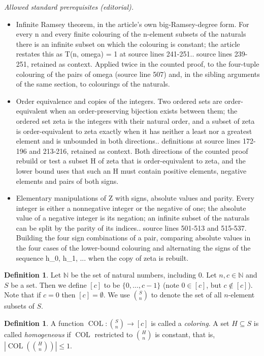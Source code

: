 \documentclass[10pt,a4paper]{article}
\newcommand{\COL}{\operatorname{COL}}
\newcommand{\N}{\mathbb{N}}
\newcommand{\numpoints}{n}
\newcommand{\numcolors}{c}
\theoremstyle{plain}
\theoremstyle{definition}
\newtheorem{definition}[theorem]{Definition}
\begin{document}
\noindent\textit{Allowed standard prerequisites (editorial).}\begin{itemize}
\item Infinite Ramsey theorem, in the article's own big-Ramsey-degree form. For every n and every finite colouring of the n-element subsets of the naturals there is an infinite subset on which the colouring is constant; the article restates this as T(n, omega) = 1 at source lines 241-251.. source lines 239-251, retained as context. Applied twice in the counted proof, to the four-tuple colouring of the pairs of omega (source line 507) and, in the sibling arguments of the same section, to colourings of the naturals.
\item Order equivalence and copies of the integers. Two ordered sets are order-equivalent when an order-preserving bijection exists between them; the ordered set zeta is the integers with their natural order, and a subset of zeta is order-equivalent to zeta exactly when it has neither a least nor a greatest element and is unbounded in both directions.. definitions at source lines 172-196 and 213-216, retained as context. Both directions of the counted proof rebuild or test a subset H of zeta that is order-equivalent to zeta, and the lower bound uses that such an H must contain positive elements, negative elements and pairs of both signs.
\item Elementary manipulations of Z with signs, absolute values and parity. Every integer is either a nonnegative integer or the negative of one; the absolute value of a negative integer is its negation; an infinite subset of the naturals can be split by the parity of its indices.. source lines 501-513 and 515-537. Building the four sign combinations of a pair, comparing absolute values in the four cases of the lower-bound colouring and alternating the signs of the sequence h\_0, h\_1, ... when the copy of zeta is rebuilt.
\end{itemize}\medskip
\begin{definition}
Let $\N$ be the set of natural numbers, including 0. 
Let $\numpoints,\numcolors \in \N$ and $S$ be a set. Then we define $[\numcolors]$ to be $ \{ 0, \ldots, \numcolors-1\}$
(note $0 \in [\numcolors]$, but $\numcolors \not \in [\numcolors]$). Note that if $\numcolors=0$ then $[\numcolors] = \emptyset$. 
We use $\binom{S}{\numpoints}$ to denote the set of all $\numpoints$-element subsets of $S$. 
\end{definition}

\begin{definition}
    A function $\COL\colon \binom{S}{\numpoints} \to [\numcolors]$ is called a \textit{coloring}.
    A set $H\subseteq S$ is called \textit{homogeneous} if $\COL$ restricted to 
    $\binom{H}{\numpoints}$ is constant,
    that is, $\left|\COL\left(\binom{H}{\numpoints}\right)\right|\le 1$.
\end{definition}
\end{document}

